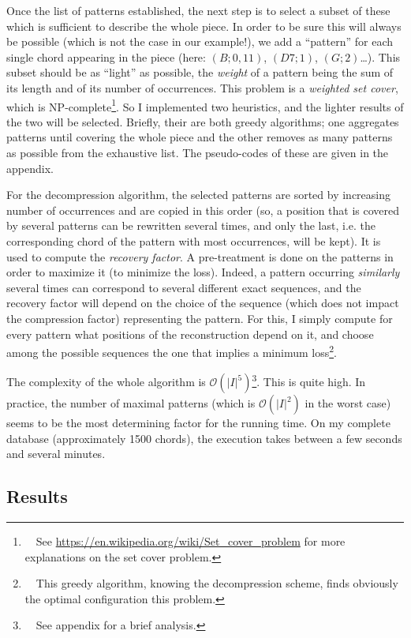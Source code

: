 \documentclass[a4paper,10pt]{article}
\newcommand{\guill}[1]{``#1''}
\newcommand{\bigO}[1]{\mathcal O\left( #1 \right)}
\begin{document}
Once the list of patterns established, the next step is to select a subset of these which is sufficient to describe the whole piece. In order to be sure this will always be possible (which is not the case in our example!), we add a \guill{pattern} for each single chord appearing in the piece (here: $(B;0,11)$, $(D7;1)$, $(G;2)$\dots). This subset should be as \guill{light} as possible, the \emph{weight} of a pattern being the sum of its length and of its number of occurrences. This problem is a \emph{weighted set cover}, which is NP-complete\footnote{~~See \href{https://en.wikipedia.org/wiki/Set\_cover\_problem}{https://en.wikipedia.org/wiki/Set\_cover\_problem} for more explanations on the set cover problem.}. So I implemented two heuristics, and the lighter results of the two will be selected. Briefly, their are both greedy algorithms; one aggregates patterns until covering the whole piece and the other removes as many patterns as possible from the exhaustive list. The pseudo-codes of these are given in the appendix.

For the decompression algorithm, the selected patterns are sorted by increasing number of occurrences and are copied in this order (so, a position that is covered by several patterns can be rewritten several times, and only the last, i.\!e. the corresponding chord of the pattern with most occurrences, will be kept). It is used to compute the \emph{recovery factor}. A pre-treatment is done on the patterns in order to maximize it (to minimize the loss). Indeed, a pattern occurring \emph{similarly} several times can correspond to several different exact sequences, and the recovery factor will depend on the choice of the sequence (which does not impact the compression factor) representing the pattern. For this, I simply compute for every pattern what positions of the reconstruction depend on it, and choose among the possible sequences the one that implies a minimum loss\footnote{~~This greedy algorithm, knowing the decompression scheme, finds obviously the optimal configuration this problem.}.

The complexity of the whole algorithm is $\bigO{|I|^5}$\footnote{~~See appendix for a brief analysis.}. This is quite high. In practice, the number of maximal patterns (which is $\bigO{|I|^2}$ in the worst case) seems to be the most determining factor for the running time. On my complete database (approximately 1500 chords), the execution takes between a few seconds and several minutes.


\subsection{Results}
\end{document}
